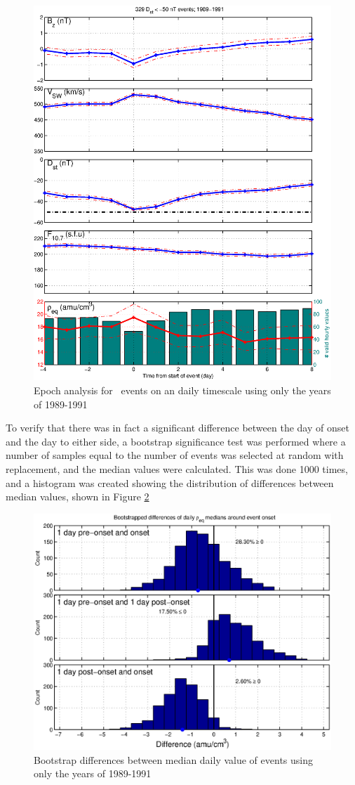 \begin{figure}[htp!]
	\centering
	\includegraphics[width=0.7\linewidth]{Figures/StormAvs/stormavs-dst-50-tak-GOES6}
	\caption{Epoch analysis for \dst\ events on an daily timescale using only the years of 1989-1991}
	\label{fig:EpochDstDayTakahashi}
\end{figure}

To verify that there was in fact a significant difference between the day of onset and the day to either side, a bootstrap significance test was performed where a number of samples equal to the number of events was selected at random with replacement, and the median values were calculated. This was done 1000 times, and a histogram was created showing the distribution of differences between median values, shown in Figure \ref{fig:DailyBootstrapDifferences}

\begin{figure}[htp!]
	\centering
	\includegraphics[width=1\linewidth]{Figures/DailyBootstrapDifferences-GOES6-case13}
	\caption{Bootstrap differences between median daily value of events using only the years of 1989-1991}
	\label{fig:DailyBootstrapDifferences}
\end{figure}

